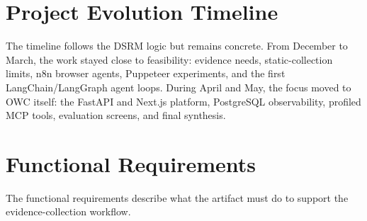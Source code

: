 \section{Project Evolution Timeline}

The timeline follows the DSRM logic but remains concrete. From December to March, the
work stayed close to feasibility: evidence needs, static-collection limits, n8n browser
agents, Puppeteer experiments, and the first LangChain/LangGraph agent loops. During
April and May, the focus moved to OWC itself: the FastAPI and Next.js platform,
PostgreSQL observability, profiled MCP tools, evaluation screens, and final synthesis.



\section{Functional Requirements}

The functional requirements describe what the artifact must do to support the
evidence-collection workflow.

